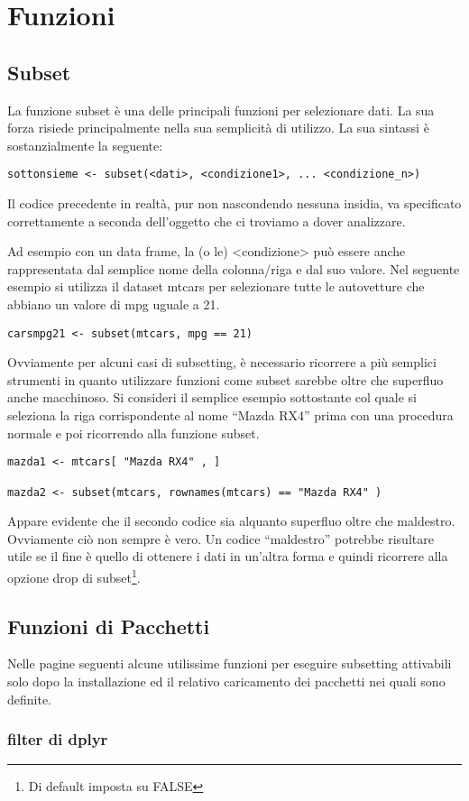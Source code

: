 \section{Funzioni}
\subsection{Subset}

La funzione subset è una delle principali funzioni per selezionare dati. La sua forza risiede principalmente nella sua semplicità di utilizzo.
La sua sintassi è sostanzialmente la seguente:

\begin{lstlisting}
sottonsieme <- subset(<dati>, <condizione1>, ... <condizione_n>)
\end{lstlisting}

Il codice precedente in realtà, pur non nascondendo nessuna insidia, va specificato correttamente a seconda dell’oggetto che ci troviamo a dover analizzare.

Ad esempio con un data frame, la (o le) <condizione> può essere anche rappresentata dal semplice nome della colonna/riga e dal suo valore. Nel seguente esempio si utilizza il dataset mtcars per selezionare tutte le autovetture che abbiano un valore di mpg uguale a 21.
\begin{lstlisting}
carsmpg21 <- subset(mtcars, mpg == 21)
\end{lstlisting}

Ovviamente per alcuni casi di subsetting, è necessario ricorrere a più semplici strumenti in quanto utilizzare funzioni come subset sarebbe oltre che superfluo anche macchinoso. Si consideri il semplice esempio sottostante col quale si seleziona la riga corrispondente al nome “Mazda RX4” prima con una procedura normale e poi ricorrendo alla funzione subset.
\begin{lstlisting}
mazda1 <- mtcars[ "Mazda RX4" , ]

mazda2 <- subset(mtcars, rownames(mtcars) == "Mazda RX4" )
\end{lstlisting}
Appare evidente che il secondo codice sia alquanto superfluo oltre che maldestro. Ovviamente ciò non sempre è vero. Un codice “maldestro” potrebbe risultare utile se il fine è quello di ottenere i dati in un’altra forma e quindi ricorrere alla opzione drop di subset\footnote{Di default imposta su FALSE}.

\subsection{Funzioni di Pacchetti}
Nelle pagine seguenti alcune utilissime funzioni per eseguire subsetting attivabili solo dopo la installazione ed il relativo caricamento dei pacchetti nei quali sono definite.
\subsubsection{filter di dplyr}
